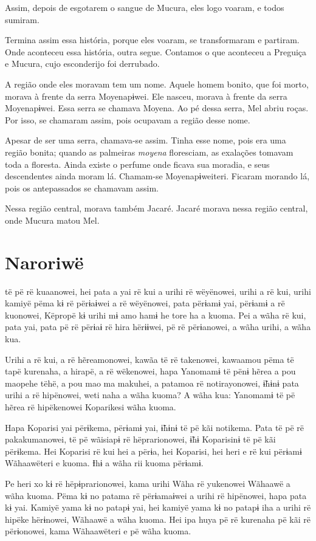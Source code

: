Assim, depois de esgotarem o sangue de Mucura, eles logo voaram, e todos
sumiram. 

Termina assim essa história, porque eles voaram, se transformaram e
partiram. Onde aconteceu essa história, outra segue. Contamos o que
aconteceu a Preguiça e Mucura, cujo esconderijo foi derrubado.

A região onde eles moravam tem um nome. Aquele homem bonito, que foi
morto, morava à frente da serra Moyenapɨwei. Ele nasceu, morava à frente
da serra Moyenapɨwei.  Essa serra se chamava Moyena.
Ao pé dessa serra, Mel abriu roças. Por isso, se chamaram assim, pois
ocupavam a região desse nome. 

Apesar de ser uma serra, chamava-se assim. Tinha esse nome, pois era uma
região bonita; quando as palmeiras \textit{moyena} floresciam, as exalações
tomavam toda a floresta. Ainda existe o perfume onde ficava sua moradia,
e seus descendentes ainda moram lá. Chamam-se Moyenapɨweiteri. Ficaram
morando lá, pois os antepassados se chamavam assim. 

Nessa região central, morava também Jacaré. Jacaré morava nessa região
central, onde Mucura matou Mel.

\chapter{Naroriwë}

 të pë rë kuaanowei, hei pata a yai rë kui a urihi rë wëyënowei,
urihi a rë kui, urihi kamiyë pëma kɨ rë përɨaɨwei a rë wëyënowei, pata
përɨamɨ yai, përɨamɨ a rë kuonowei, Këpropë kɨ urihi mɨ amo hamɨ he tore
ha a kuoma. Pei a wãha rë kui, pata yai, pata pë rë përɨaɨ rë hira
hërɨɨwei, pë rë përɨanowei, a wãha urihi, a wãha kua. 

Urihi a rë kui, a rë hẽreamonowei, kawãa të rë takenowei, kawaamou pëma
të tapë kurenaha, a hirapë, a rë wëkenowei, hapa Yanomamɨ të pënɨ hẽrea
a pou maopehe tëhë, a pou mao ma makuhei, a patamoa rë notirayonowei,
ɨ̃hɨnɨ pata urihi a rë hipënowei, weti naha a wãha kuoma? A wãha kua:
Yanomamɨ të pë hẽrea rë hipëkenowei Koparikesi wãha kuoma. 

Hapa Koparisi yai përɨkema, përɨamɨ yai, ɨ̃hɨnɨ të pë kãi notikema. Pata
të pë rë pakakumanowei, të pë wãisiapɨ rë hëprarionowei, ɨ̃hɨ Koparisinɨ
të pë kãi përɨkema. Hei Koparisi rë kui hei a përɨa, hei Koparisi, hei
heri e rë kui përɨamɨ Wãhaawëteri e kuoma. Ɨhɨ a wãha rii kuoma
përɨamɨ. 

Pe heri xo kɨ rë hëpɨprarionowei, kama urihi Wãha rë yukenowei Wãhaawë a
wãha kuoma. Pëma kɨ no patama rë përɨamaɨwei a urihi rë hipënowei, hapa
pata kɨ yai. Kamiyë yama kɨ no patapɨ yai, hei kamiyë yama kɨ no patapɨ
iha a urihi rë hipëke hërɨnowei, Wãhaawë a wãha kuoma. Hei ipa huya pë rë
kurenaha pë kãi rë përɨonowei, kama Wãhaawëteri e pë wãha kuoma. 

